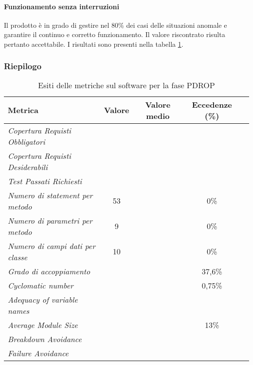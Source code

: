 \documentclass[../PianoDiQualifica.tex]{subfiles}
\begin{document}
\begin{appendices}
			\paragraph{Funzionamento senza interruzioni}	
			Il prodotto è in grado di gestire nel 80\% dei casi delle situazioni anomale e garantire il continuo e corretto funzionamento. Il valore riscontrato risulta pertanto accettabile.
			I risultati sono presenti nella tabella \ref{tab:esiti_metriche_sul_software}.
			
			\subsubsection{Riepilogo}
			\begin{table}[H]
				\centering
				\begin{tabular}{l * {4}{c}}
					\toprule
					\textbf{Metrica} & \textbf{Valore} & \textbf{Valore medio} & \textbf{Eccedenze (\%) }\\
					\midrule
					\textit{Copertura Requisti Obbligatori}  & \color{red}{77,67\%} & & \\
					\textit{Copertura Requisti Desiderabili}  & \color{red}{76,92\%} & & \\
					\textit{Test Passati Richiesti} & \color{red}{46,06\%} & & \\
					\textit{Numero di statement per metodo} & 53 & \color{dkgreen}{4,25} & 0\% \\
					\textit{Numero di parametri per metodo} & 9 & \color{dkgreen}{0,80} & 0\% \\
					\textit{Numero di campi dati per classe} & 10 & \color{dkgreen}{2,65} & 0\% \\
					\textit{Grado di accoppiamento}  & & \color{red}{10,11} & 37,6\% \\
					\textit{Cyclomatic number} & & \color{dkgreen}{1,69} & 0,75\% \\
					\textit{Adequacy of variable names}  & \color{dkgreen}{100\%} & & \\
					\textit{Average Module Size} & & \color{dkgreen}{19,84} & 13\% \\
					\textit{Breakdown Avoidance}  & \color{dkgreen}{80\%} & & \\
					\textit{Failure Avoidance}  & \color{dkgreen}{80\%} & & \\
					\bottomrule
				\end{tabular}
				\caption{Esiti delle metriche sul software per la fase PDROP}
				\label{tab:esiti_metriche_sul_software}
			\end{table}	
\end{appendices}
\end{document}

